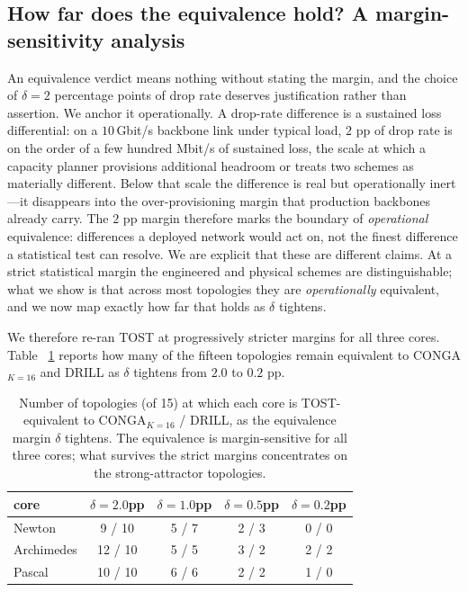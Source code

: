 \subsection{How far does the equivalence hold? A margin-sensitivity analysis}
\label{sec:margin-sensitivity}

An equivalence verdict means nothing without stating the margin, and the choice
of $\delta = 2$ percentage points of drop rate deserves justification rather
than assertion. We anchor it operationally. A drop-rate difference is a
sustained loss differential: on a $10$\,Gbit/s backbone link under typical load,
$2$ pp of drop rate is on the order of a few hundred Mbit/s of sustained loss,
the scale at which a capacity planner provisions additional headroom or treats
two schemes as materially different. Below that scale the difference is real but
operationally inert---it disappears into the over-provisioning margin that
production backbones already carry.
The $2$ pp margin therefore marks the boundary of \emph{operational}
equivalence: differences a deployed network would act on, not the finest
difference a statistical test can resolve. We are explicit that these are
different claims. At a strict statistical margin the engineered and physical
schemes are distinguishable; what we show is that across most topologies they
are \emph{operationally} equivalent, and we now map exactly how far that holds
as $\delta$ tightens.

We therefore re-ran TOST at progressively stricter margins for all three cores. Table~%
\ref{tab:margins} reports how many of the fifteen topologies remain equivalent
to CONGA$_{K=16}$ and DRILL as $\delta$ tightens from $2.0$ to $0.2$ pp.

\begin{table}[t]
\centering
\caption{Number of topologies (of 15) at which each core is TOST-equivalent to
CONGA$_{K=16}$ / DRILL, as the equivalence margin $\delta$ tightens. The
equivalence is margin-sensitive for all three cores; what survives the strict
margins concentrates on the strong-attractor topologies.}
\label{tab:margins}
\small
\begin{tabular}{lcccc}
\toprule
core & $\delta=2.0$pp & $\delta=1.0$pp & $\delta=0.5$pp & $\delta=0.2$pp \\
\midrule
Newton     & 9 / 10  & 5 / 7 & 2 / 3 & 0 / 0 \\
Archimedes & 12 / 10 & 5 / 5 & 3 / 2 & 2 / 2 \\
Pascal     & 10 / 10 & 6 / 6 & 2 / 2 & 1 / 0 \\
\bottomrule
\end{tabular}
\end{table}

